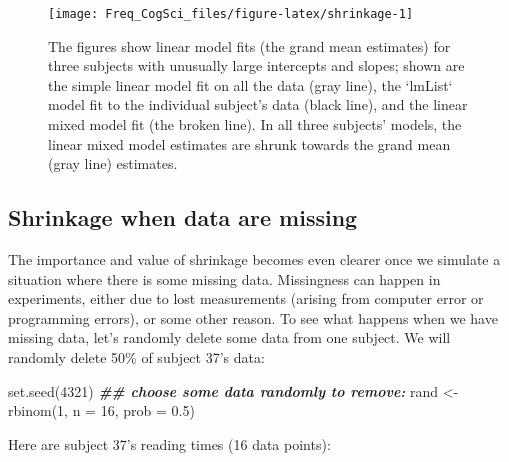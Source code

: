 \documentclass[
  12pt,
]{krantz}
\newenvironment{Shaded}{\begin{snugshade}}{\end{snugshade}}
\newcommand{\AttributeTok}[1]{\textcolor[rgb]{0.77,0.63,0.00}{#1}}
\newcommand{\DecValTok}[1]{\textcolor[rgb]{0.00,0.00,0.81}{#1}}
\newcommand{\DocumentationTok}[1]{\textcolor[rgb]{0.56,0.35,0.01}{\textbf{\textit{#1}}}}
\newcommand{\FloatTok}[1]{\textcolor[rgb]{0.00,0.00,0.81}{#1}}
\newcommand{\FunctionTok}[1]{\textcolor[rgb]{0.00,0.00,0.00}{#1}}
\newcommand{\NormalTok}[1]{#1}
\newcommand{\OtherTok}[1]{\textcolor[rgb]{0.56,0.35,0.01}{#1}}
\newcommand{\SpecialCharTok}[1]{\textcolor[rgb]{0.00,0.00,0.00}{#1}}
\theoremstyle{definition}
\theoremstyle{definition}
\theoremstyle{definition}
\theoremstyle{definition}
\theoremstyle{remark}
\begin{document}
\begin{figure}
\texttt{[image: Freq\_CogSci\_files/figure-latex/shrinkage-1]} \caption{The figures show linear model fits (the grand mean estimates) for three subjects with unusually large intercepts and slopes; shown are the simple linear model fit on all the data (gray line), the `lmList` model fit to the individual subject's data (black line), and the linear mixed model fit (the broken line). In all three subjects' models, the linear mixed model estimates are shrunk towards the grand mean (gray line) estimates.}\label{fig:shrinkage}
\end{figure}

\hypertarget{shrinkage-when-data-are-missing}{%
\subsection{Shrinkage when data are missing}\label{shrinkage-when-data-are-missing}}

The importance and value of shrinkage becomes even clearer once we simulate a situation where there is some missing data. Missingness can happen in experiments, either due to lost measurements (arising from computer error or programming errors), or some other reason. To see what happens when we have missing data, let's randomly delete some data from one subject. We will randomly delete 50\% of subject 37's data:

\begin{Shaded}
\begin{Highlighting}[]
\FunctionTok{set.seed}\NormalTok{(}\DecValTok{4321}\NormalTok{)}
\DocumentationTok{\#\# choose some data randomly to remove:}
\NormalTok{rand }\OtherTok{\textless{}{-}} \FunctionTok{rbinom}\NormalTok{(}\DecValTok{1}\NormalTok{, }\AttributeTok{n =} \DecValTok{16}\NormalTok{, }\AttributeTok{prob =} \FloatTok{0.5}\NormalTok{)}
\end{Highlighting}
\end{Shaded}

Here are subject 37's reading times (16 data points):

\begin{Shaded}
\end{Shaded}
\end{document}
